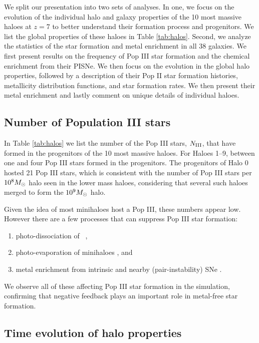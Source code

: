 \documentclass[useAMS,usenatbib]{mn2e}
\begin{document}
We split our presentation into two sets of analyses.  In one, we focus
on the evolution of the individual halo and galaxy properties of the
10 most massive haloes at $z=7$ to better understand their formation
process and progenitors.  We list the global properties of these
haloes in Table \ref{tab:halos}.  Second, we analyze the statistics of
the star formation and metal enrichment in all 38 galaxies.  We first
present results on the frequency of Pop III star formation and the
chemical enrichment from their PISNe.  We then focus on the evolution
in the global halo properties, followed by a description of their Pop
II star formation histories, metallicity distribution functions, and
star formation rates.  We then present their metal enrichment and
lastly comment on unique details of individual haloes.

\subsection{Number of Population III stars}

In Table \ref{tab:halos} we list the number of the Pop III stars,
$N_{\rm III}$, that have formed in the progenitors of the 10 most
massive haloes.  For Haloes 1--9, between one and four Pop III stars
formed in the progenitors.  The progenitors of Halo 0 hosted 21 Pop
III stars, which is consistent with the number of Pop III stars per
$10^8 \Ms$ halo seen in the lower mass haloes, considering that
several such haloes merged to form the $10^9 \Ms$ halo.

Given the idea of most minihaloes host a Pop III, these numbers appear
low.  However there are a few processes that can suppress Pop III star
formation:
%
\begin{enumerate}
\item photo-dissociation of \hh~\citep{Dekel87, Haiman00, Machacek01},
\item photo-evaporation of minihaloes \citep{Shapiro04, whalen08}, and
\item metal enrichment from intrinsic and nearby (pair-instability)
  SNe \citep{Wise08_Gal, Trenti09, Greif10}.
\end{enumerate}
We observe all of these affecting Pop III star formation in the
simulation, confirming that negative feedback plays an important role
in metal-free star formation.

\subsection{Time evolution of halo properties}
\end{document}

